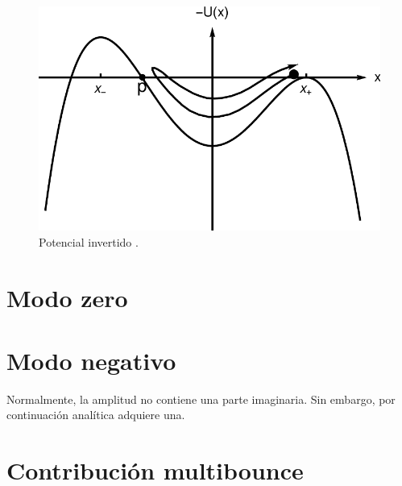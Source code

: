 \begin{figure}[h]
	\centering
	\includegraphics[scale = 0.3]{FIGURAS/potencial_invertido}
	\caption{Potencial invertido \cite{Ai:2019dqr}.}
	\label{fig:potencial_invertido}
\end{figure}


\section{Modo zero}

\section{Modo negativo}

Normalmente, la amplitud no contiene una parte imaginaria. Sin embargo, por continuación analítica adquiere una. 

\section{Contribución multibounce}
